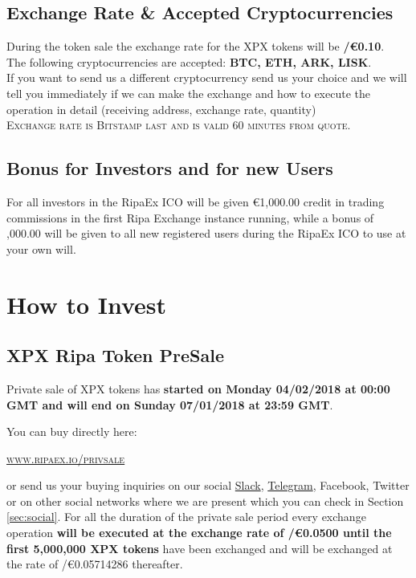 \documentclass[11pt,fleqn]{book} %
\begin{document}
\subsection{Exchange Rate \& Accepted Cryptocurrencies}
During the token sale the exchange rate for the XPX tokens will be \textbf{\PHP/\euro0.10}.\\

The following cryptocurrencies are accepted: \textbf{BTC, ETH, ARK, LISK}.\\

If you want to send us a different cryptocurrency send us your choice and we will tell you immediately if we can make 
the exchange and how to execute the operation in detail (receiving address, exchange rate, quantity)\\

\textsc{Exchange rate is Bitstamp last and is valid 60 minutes from quote}.

\subsection{Bonus for Investors and for new Users}
For all investors in the RipaEx ICO will be given \euro1,000.00 credit in trading commissions 
in the first Ripa Exchange instance running, while a bonus of ,000.00 will be given
to all new registered users during the RipaEx ICO to use at your own will.

\section{How to Invest}
\subsection{XPX Ripa Token PreSale}
Private sale of XPX tokens has \textbf{started on Monday 04/02/2018 at 00:00 GMT and will end on Sunday 07/01/2018 at 23:59 GMT}.

You can buy directly here: 
\begin{center}
	\href{https://www.ripaex.io/privsale}{\textsc{www.ripaex.io/privsale}}
\end{center}

or send us your buying inquiries on our social 
\href{https://join.slack.com/t/ripaex/shared_invite/enQtMzM4NzUwNjU4OTQ0LTY3MDJmMTdhYTNlZjJlNGUxNzM1YjUwYjgyYjZlMDJmOTg3NTIzNThmNTYyMGQ3ODBkOTRmYzk3Y2Y4MzBkOTY}{Slack},
\href{https://t.me/ripaex}{Telegram},
Facebook, Twitter or on other social networks where we are present which you can check in Section \ref{sec:social}.
For all the duration of the private sale period every exchange operation \textbf{will be executed at the exchange rate of \PHP/\euro0.0500 
until the first 5,000,000 XPX tokens} have been exchanged and will be exchanged at the rate of \PHP/\euro0.05714286 thereafter.
\end{document}
